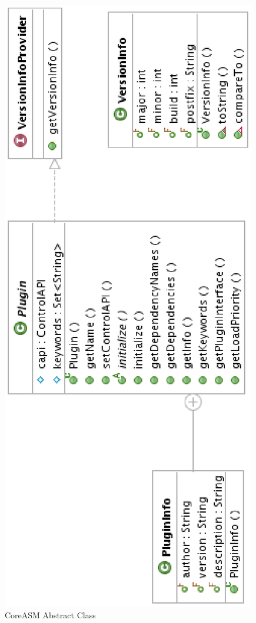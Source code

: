 \documentclass{article}
\begin{document}
\begin{figure}
\includegraphics[angle=-90,width=\textwidth]{figures/PluginClass.eps}
\caption{CoreASM  Abstract Class}
\label{fig:pluginClass}
\end{figure}
 
\end{document}
